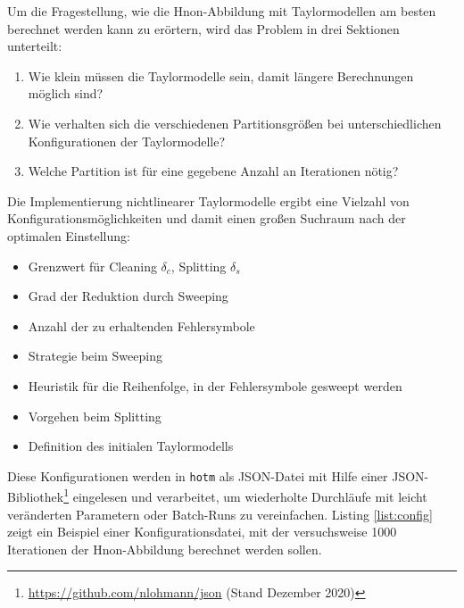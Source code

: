 Um die Fragestellung, wie die H\e non-Abbildung mit Taylormodellen am besten berechnet werden kann zu erörtern, wird das Problem in drei Sektionen unterteilt:

\begin{enumerate}
 \item Wie klein müssen die Taylormodelle sein, damit längere Berechnungen möglich sind?
 \item Wie verhalten sich die verschiedenen Partitionsgrößen bei unterschiedlichen Konfigurationen der Taylormodelle?
 \item Welche Partition ist für eine gegebene Anzahl an Iterationen nötig?
\end{enumerate}




Die Implementierung nichtlinearer Taylormodelle ergibt eine Vielzahl von Konfigurationsmöglichkeiten und damit einen großen Suchraum nach der optimalen Einstellung:
\begin{itemize}
 \item Grenzwert für Cleaning $\delta_c$, Splitting $\delta_s$
 \item Grad der Reduktion durch Sweeping
 \item Anzahl der zu erhaltenden Fehlersymbole
 \item Strategie beim Sweeping
 \item Heuristik für die Reihenfolge, in der Fehlersymbole gesweept werden
 \item Vorgehen beim Splitting
 \item Definition des initialen Taylormodells
\end{itemize}
Diese Konfigurationen werden in \verb+hotm+ als JSON-Datei mit Hilfe einer JSON-Bibliothek\footnote{\url{https://github.com/nlohmann/json} (Stand Dezember 2020)} eingelesen und verarbeitet, um wiederholte Durchläufe mit leicht veränderten Parametern oder Batch-Runs zu vereinfachen. Listing \ref{list:config} zeigt ein Beispiel einer Konfigurationsdatei, mit der versuchsweise 1000 Iterationen der H\e non-Abbildung berechnet werden sollen. 



